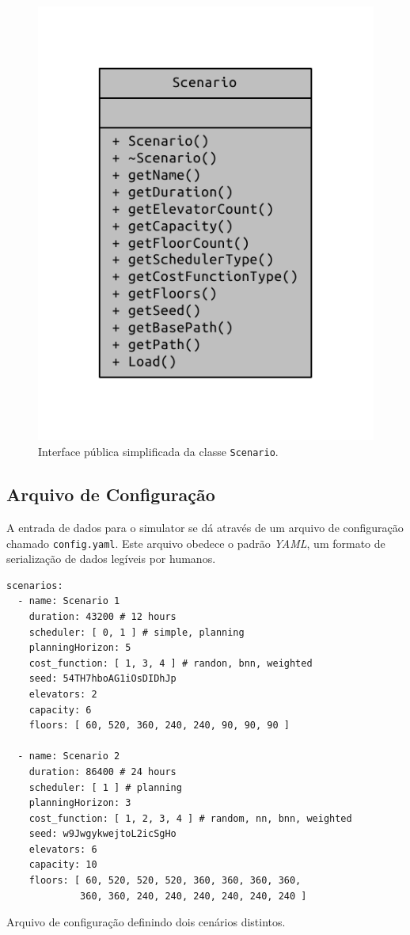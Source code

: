 \begin{figure}[htb!]
  \centering
  \includegraphics{doc/latex/class_scenario__coll__graph}
  \caption{Interface pública simplificada da classe \texttt{Scenario}.}
\label{fig:diagram:scenario}
\end{figure}

\subsection{\label{model:scenario:config}Arquivo de Configuração}

A entrada de dados para o simulator se dá através de um arquivo de configuração
chamado \texttt{config.yaml}. Este arquivo obedece o padrão \textit{YAML}, um
formato de serialização de dados legíveis por humanos.

\begin{algorithm}[htb]
  \centering
    \begin{verbatim}
scenarios:
  - name: Scenario 1
    duration: 43200 # 12 hours
    scheduler: [ 0, 1 ] # simple, planning
    planningHorizon: 5
    cost_function: [ 1, 3, 4 ] # randon, bnn, weighted
    seed: 54TH7hboAG1iOsDIDhJp
    elevators: 2
    capacity: 6
    floors: [ 60, 520, 360, 240, 240, 90, 90, 90 ]

  - name: Scenario 2
    duration: 86400 # 24 hours
    scheduler: [ 1 ] # planning
    planningHorizon: 3
    cost_function: [ 1, 2, 3, 4 ] # random, nn, bnn, weighted
    seed: w9JwgykwejtoL2icSgHo
    elevators: 6
    capacity: 10
    floors: [ 60, 520, 520, 520, 360, 360, 360, 360,
             360, 360, 240, 240, 240, 240, 240, 240 ]
    \end{verbatim}
  \caption{Arquivo de configuração definindo dois cenários distintos.}
  \label{alg:config}
\end{algorithm}

